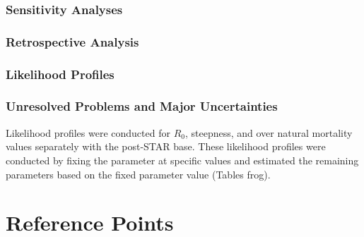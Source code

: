 \documentclass[11pt,
  english,
  a4paper,
]{article}
\begin{document}
\hypertarget{sensitivity-analyses}{%
\subsubsection{Sensitivity Analyses}\label{sensitivity-analyses}}

\leavevmode\tagmcend\tagstructend


\hypertarget{retrospective-analysis}{%
\subsubsection{Retrospective Analysis}\label{retrospective-analysis}}

\leavevmode\tagmcend\tagstructend


\hypertarget{likelihood-profiles}{%
\subsubsection{Likelihood Profiles}\label{likelihood-profiles}}

\leavevmode\tagmcend\tagstructend


\hypertarget{unresolved-problems-and-major-uncertainties-1}{%
\subsubsection{Unresolved Problems and Major Uncertainties}\label{unresolved-problems-and-major-uncertainties-1}}

\leavevmode\tagmcend\tagstructend

Likelihood profiles were conducted for {\(R_0\)\leavevmode\tagmcend\tagstructend}, steepness, and over natural mortality values separately with the post-STAR base. These likelihood profiles were conducted by fixing the parameter at specific values and estimated the remaining parameters based on the fixed parameter value (Tables frog).


\hypertarget{reference-points-2}{%
\section{Reference Points}\label{reference-points-2}}
\end{document}
